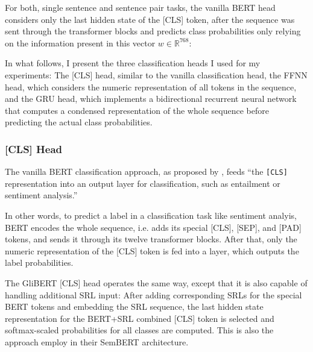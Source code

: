 For both, single sentence and sentence pair tasks, the vanilla BERT head considers
only the last hidden state of the [CLS] token, after the sequence was sent through
the transformer blocks and predicts class probabilities only relying on the
information present in this vector $w \in \mathbb{R}^{768}$:

In what follows, I present the three classification heads I used for my experiments: The
[CLS] head, similar to the vanilla classification head, the FFNN head, which considers the
numeric representation of all tokens in the sequence, and the GRU head, which implements
a bidirectional recurrent neural network that computes a condensed representation of the
whole sequence before predicting the actual class probabilities.



\subsubsection{[CLS] Head}

The vanilla BERT classification approach, as proposed by \cite{devlin2018bert}, feeds
``the \texttt{[CLS]} representation \textelp{} into an output layer for classification,
such as entailment or sentiment analysis.''

In other words, to predict a label in a classification task like sentiment analyis, BERT
encodes the whole sequence, i.e. adds its special [CLS], [SEP], and [PAD] tokens, and
sends it through its twelve transformer blocks. After that, only the numeric representation
of the [CLS] token is fed into a layer, which outputs the label probabilities.

The GliBERT [CLS] head operates the same way, except that it is also capable of
handling additional SRL input: After adding corresponding SRLs for the special BERT
tokens and embedding the SRL sequence, the last hidden state representation for the
BERT+SRL combined [CLS] token is selected and softmax-scaled probabilities for all
classes are computed. This is also the approach \cite{zhang2019semantics} employ in
their SemBERT architecture.


